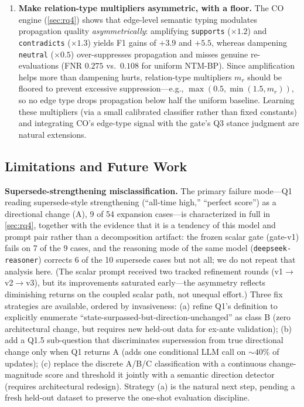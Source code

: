 \documentclass{article}
\theoremstyle{definition}
\begin{document}
\begin{enumerate}
\item \textbf{Make relation-type multipliers asymmetric, with a floor.}
  The CO engine (\cref{sec:rq4}) shows that edge-level semantic typing
  modulates propagation quality \emph{asymmetrically}: amplifying
  \texttt{supports} ($\times1.2$) and \texttt{contradicts} ($\times1.3$)
  yields F1 gains of $+3.9$ and $+5.5$, whereas dampening \texttt{neutral}
  ($\times0.5$) over-suppresses propagation and misses genuine
  re-evaluations (FNR $0.275$ vs.\ $0.108$ for uniform NTM-BP).  Since
  amplification helps more than dampening hurts, relation-type multipliers
  $m_r$ should be floored to prevent excessive suppression---e.g.,
  $\max(0.5,\min(1.5,m_r))$, so no edge type drops propagation below half
  the uniform baseline.  Learning these multipliers (via a small
  calibrated classifier rather than fixed constants) and integrating CO's
  edge-type signal with the gate's Q3 stance judgment are natural
  extensions.
\end{enumerate}

\subsection{Limitations and Future Work}
\label{sec:limitations}

\textbf{Supersede-strengthening misclassification.}  The primary
failure mode---Q1 reading supersede-style strengthening (``all-time
high,'' ``perfect score'') as a directional change (A), 9 of 54
expansion cases---is characterized in full in \cref{sec:rq4}, together
with the evidence that it is a tendency of this model and prompt pair
rather than a decomposition artifact: the frozen scalar gate (gate-v1)
fails on 7 of the 9 cases, and the reasoning mode of the same model
(\texttt{deepseek-reasoner}) corrects 6 of the 10 supersede cases but
not all; we do not repeat that analysis here.  (The
scalar prompt received two tracked refinement rounds
(v1$\to$v2$\to$v3), but its improvements saturated early---the asymmetry
reflects diminishing returns on the coupled scalar path, not unequal
effort.)  Three fix strategies are available, ordered
by invasiveness: (a) refine Q1's definition to explicitly enumerate
``state-surpassed-but-direction-unchanged'' as class B (zero
architectural change, but requires new held-out data for ex-ante
validation); (b) add a Q1.5 sub-question that discriminates
supersession from true directional change only when Q1 returns A (adds
one conditional LLM call on $\sim 40\%$ of updates); (c) replace the
discrete A/B/C classification with a continuous change-magnitude score
and threshold it jointly with a semantic direction detector (requires
architectural redesign).  Strategy (a) is the natural next step,
pending a fresh held-out dataset to preserve the one-shot evaluation
discipline.
\end{document}
